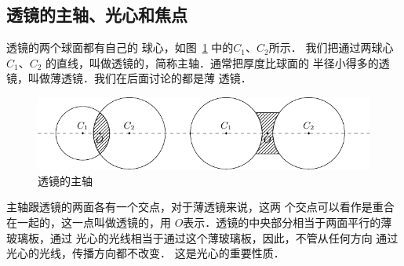 \subsection{透镜的主轴、光心和焦点}

透镜的两个球面都有自己的
球心，如图~\ref{fig_C_5-35} 中的$C_1$、$C_2$所示．
我们把通过两球心$C_1$、$C_2$
的直线，叫做透镜的，简称主轴．通常把厚度比球面的
半径小得多的透镜，叫做薄透镜．我们在后面讨论的都是薄
透镜．
\begin{figure}[htbp]
    \centering
    \includegraphics{fig/C/5-35.pdf}
    \caption{透镜的主轴}\label{fig_C_5-35}
\end{figure}

主轴跟透镜的两面各有一个交点，对于薄透镜来说，这两
个交点可以看作是重合在一起的，这一点叫做透镜的，用
$O$表示．透镜的中央部分相当于两面平行的薄玻璃板，通过
光心的光线相当于通过这个薄玻璃板，因此，不管从任何方向
通过光心的光线，传播方向都不改变．
这是光心的重要性质．

